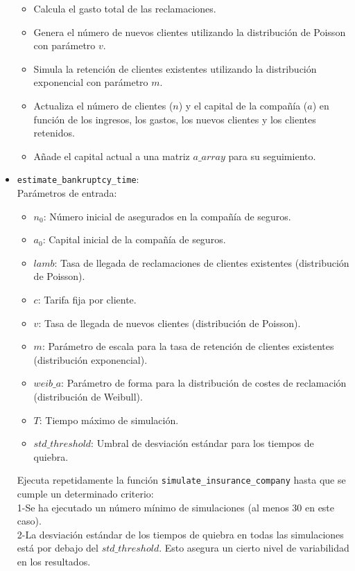 \documentclass{article}
\begin{document}
\begin{itemize}
\begin{itemize}
            \item Calcula el gasto total de las reclamaciones.
            \item Genera el número de nuevos clientes utilizando la distribución de Poisson con parámetro $v$.
            \item Simula la retención de clientes existentes utilizando la distribución exponencial con parámetro $m$.
            \item Actualiza el número de clientes ($n$) y el capital de la compañía ($a$) en función de los ingresos, los gastos, los nuevos clientes y los clientes retenidos.
            \item Añade el capital actual a una matriz $a\_array$ para su seguimiento.
        \end{itemize}
    \item \texttt{estimate\_bankruptcy\_time}: \\
    Parámetros de entrada:
    \begin{itemize}
        \item $n_0$: Número inicial de asegurados en la compañía de seguros.
            \item $a_0$: Capital inicial de la compañía de seguros.
            \item $lamb$: Tasa de llegada de reclamaciones de clientes existentes (distribución de Poisson).
            \item $c$: Tarifa fija por cliente. 
            \item $v$: Tasa de llegada de nuevos clientes (distribución de Poisson).
            \item $m$: Parámetro de escala para la tasa de retención de clientes existentes (distribución exponencial).
            \item $weib\_a$: Parámetro de forma para la distribución de costes de reclamación (distribución de Weibull).
            \item $T$: Tiempo máximo de simulación.
            \item $std\_threshold$: Umbral de desviación estándar para los tiempos de quiebra.
    \end{itemize}
    Ejecuta repetidamente la función \texttt{simulate\_insurance\_company} hasta que se cumple un determinado criterio:\\

    1-Se ha ejecutado un número mínimo de simulaciones (al menos 30 en este caso).\\
    2-La desviación estándar de los tiempos de quiebra en todas las simulaciones está por debajo del $std\_threshold$. Esto asegura un cierto nivel de variabilidad en los resultados.


\end{itemize}
\end{document}
